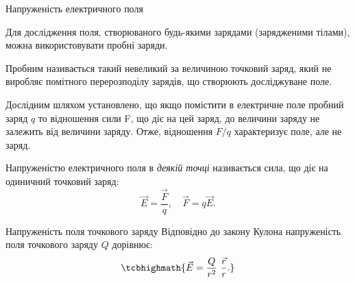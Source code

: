 \documentclass{beamer}
\begin{document}
\begin{frame}{Напруженість електричного поля}{}
	\begin{block}{}\justifying
		Для дослідження поля, створюваного будь-якими зарядами
		(зарядженими тілами), можна використовувати \alert{пробні заряди}.

		\bigskip

		\alert{Пробним} називається такий невеликий за величиною точковий
		заряд, який не виробляє помітного перерозподілу зарядів,
		що створюють досліджуване поле.
	\end{block}

	\begin{block}{}\justifying
		Дослідним шляхом установлено, що якщо помістити в електричне
		поле пробний заряд $q$ то відношення сили F, що діє на цей
		заряд, до величини заряду не залежить від величини заряду. Отже,
		відношення $F/q$ характеризує поле, але не заряд.
	\end{block}

	\begin{block}{}
		\alert{Напруженістю електричного поля} в \emph{деякій точці}
		називається сила, що діє на одиничний точковий заряд:
		\begin{equation*}
			\vec{E} = \frac{\vec{F}}{q}, \quad \vec{F} = q\vec{E}.
		\end{equation*}
	\end{block}
\end{frame}


\begin{frame}{Напруженість поля точкового заряду}{}
	Відповідно до закону Кулона напруженість поля точкового
	заряду $Q$ дорівнює:
	\begin{equation*}
		\tcbhighmath{
			\vec{E} = \frac{Q}{r^2}\ \frac{\vec{r}}{r}.
		}
	\end{equation*}
	
\end{frame}
\end{document}
